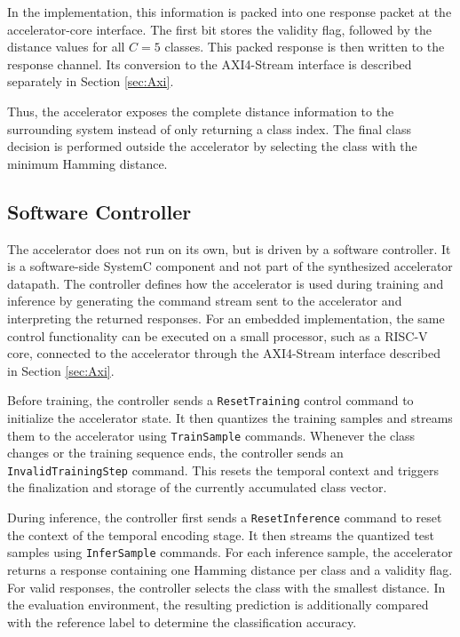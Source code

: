         In the implementation, this information is packed into one response packet at the accelerator-core interface. The first bit stores the validity flag, followed by the distance values for all $C=5$ classes. This packed response is then written to the response channel. Its conversion to the AXI4-Stream interface is described separately in Section \ref{sec:Axi}.
        
        Thus, the accelerator exposes the complete distance information to the surrounding system instead of only returning a class index. 
        The final class decision is performed outside the accelerator by selecting the class with the minimum Hamming distance.

\subsection{Software Controller}
\label{sec:controller}

The accelerator does not run on its own, but is driven by a software controller. It is a software-side SystemC component and not part of the synthesized accelerator datapath. The controller defines how the accelerator is used during training and inference by generating the command stream sent to the accelerator and interpreting the returned responses. For an embedded implementation, the same control functionality can be executed on a small processor, such as a RISC-V core, connected to the accelerator through the AXI4-Stream interface described in Section \ref{sec:Axi}.

Before training, the controller sends a \texttt{ResetTraining} control command to initialize the accelerator state. It then quantizes the training samples and streams them to the accelerator using \texttt{TrainSample} commands. Whenever the class changes or the training sequence ends, the controller sends an \texttt{InvalidTrainingStep} command. This resets the temporal context and triggers the finalization and storage of the currently accumulated class vector.

During inference, the controller first sends a \texttt{ResetInference} command to reset the context of the temporal encoding stage. It then streams the quantized test samples using \texttt{InferSample} commands. For each inference sample, the accelerator returns a response containing one Hamming distance per class and a validity flag.
For valid responses, the controller selects the class with the smallest distance. In the evaluation environment, the resulting prediction is additionally compared with the reference label to determine the classification accuracy.\\

